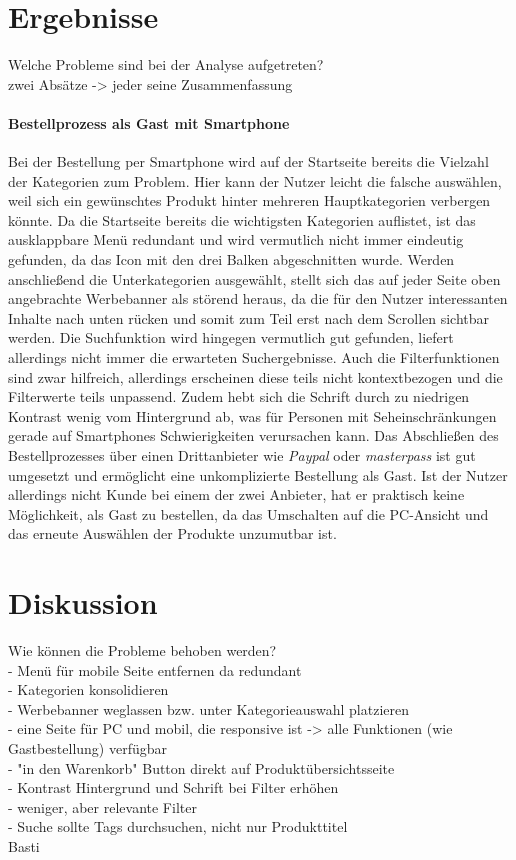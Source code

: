 \documentclass[	12pt, 
				a4paper, 
				BCOR=10mm, %
				DIV=12, 
				parskip=half, %
				headings=small, %
				twoside, %
				ngerman,
				bibliography=totoc,index=totoc, listof=totoc,
				numbers=noendperiod
				]{scrbook} %
\theoremstyle{plain}%
\theoremstyle{definition}
\theoremstyle{remark}
\begin{document}
\section{Ergebnisse}
Welche Probleme sind bei der Analyse aufgetreten?\\
zwei Absätze -> jeder seine Zusammenfassung

\paragraph{Bestellprozess als Gast mit Smartphone} Bei der Bestellung per Smartphone wird auf der Startseite bereits die Vielzahl der Kategorien zum Problem. Hier kann der Nutzer leicht die falsche auswählen, weil sich ein gewünschtes Produkt hinter mehreren Hauptkategorien verbergen könnte. Da die Startseite bereits die wichtigsten Kategorien auflistet, ist das ausklappbare Menü redundant und wird vermutlich nicht immer eindeutig gefunden, da das Icon mit den drei Balken abgeschnitten wurde. Werden anschließend die Unterkategorien ausgewählt, stellt sich das auf jeder Seite oben angebrachte Werbebanner als störend heraus, da die für den Nutzer interessanten Inhalte nach unten rücken und somit zum Teil erst nach dem Scrollen sichtbar werden. Die Suchfunktion wird hingegen vermutlich gut gefunden, liefert allerdings nicht immer die erwarteten Suchergebnisse. Auch die Filterfunktionen sind zwar hilfreich, allerdings erscheinen diese teils nicht kontextbezogen und die Filterwerte teils unpassend. Zudem hebt sich die Schrift durch zu niedrigen Kontrast wenig vom Hintergrund ab, was für Personen mit Seheinschränkungen gerade auf Smartphones Schwierigkeiten verursachen kann. Das Abschließen des Bestellprozesses über einen Drittanbieter wie \textit{Paypal} oder \textit{masterpass} ist gut umgesetzt und ermöglicht eine unkomplizierte Bestellung als Gast. Ist der Nutzer allerdings nicht Kunde bei einem der zwei Anbieter, hat er praktisch keine Möglichkeit, als Gast zu bestellen, da das Umschalten auf die PC-Ansicht und das erneute Auswählen der Produkte unzumutbar ist.

\section{Diskussion}
Wie können die Probleme behoben werden?\\
- Menü für mobile Seite entfernen da redundant\\
- Kategorien konsolidieren\\
- Werbebanner weglassen bzw. unter Kategorieauswahl platzieren\\
- eine Seite für PC und mobil, die responsive ist -> alle Funktionen (wie Gastbestellung) verfügbar\\
- "in den Warenkorb" Button direkt auf Produktübersichtsseite\\
- Kontrast Hintergrund und Schrift bei Filter erhöhen\\
- weniger, aber relevante Filter\\
- Suche sollte Tags durchsuchen, nicht nur Produkttitel\\
Basti
\end{document}
